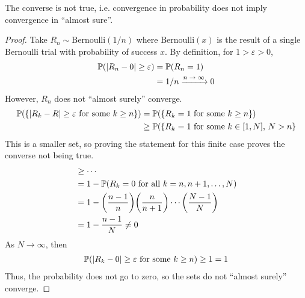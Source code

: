 \begin{lemma}
    The converse is not true, i.e. convergence in probability does not imply convergence in ``almost sure''.
\end{lemma}
\begin{proof}
    Take $R_n \sim \text{Bernoulli}(1/n)$ where $\text{Bernoulli}(x)$ is the result of a single Bernoulli trial with probability of success $x$. By definition, for $1 > \varepsilon > 0$,
    \begin{align}
        \probability(\abs{R_n - 0} \ge \varepsilon)
        &= \probability(R_n = 1)\\
        &= 1/n \ce{->[$n \to \infty$]} 0
    \end{align}
    However, $R_n$ does not ``almost surely'' converge.
    \begin{align}
        \mathbb{P}(\{ \abs{R_k - R} \ge \varepsilon \text{ for some $k \ge n$} \})
        &= \mathbb{P}(\{R_k = 1 \text{ for some $k \ge n$}\})\\
        &\ge \mathbb{P}(\{ R_k = 1 \text{ for some $k \in [1,N]$, $N > n$} \}
    \end{align}
    This is a smaller set, so proving the statement for this finite case proves the converse not being true.
    \begin{align}
        &\ge \cdots\\
        &= 1 - \mathbb{P}(R_k = 0 \text{ for all } k = n, n+1, \ldots, N)\\
        &= 1 - \qty(\frac{n-1}{n})\qty(\frac{n}{n+1})\cdots\qty(\frac{N-1}{N})\\
        &= 1 - \frac{n-1}{N} \ne 0
    \end{align}
    As $N \to \infty$, then
    \begin{align}
        \mathbb{P}(\abs{R_k - 0} \ge \varepsilon \text{ for some $k \ge n$}) \ge 1 = 1
    \end{align}
    Thus, the probability does not go to zero, so the sets do not ``almost surely'' converge.
\end{proof}

